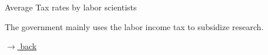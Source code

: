 \documentclass[11pt,aspectratio=169]{beamer}
\begin{document}
\begin{frame}{Average Tax rates by labor scientists}
\begin{figure}[h!!]
\begin{subfigure}{0.4\textwidth}
		\end{subfigure}
		
	\end{figure}
	\vspace{5mm}
	\begin{block}{}
		The government mainly uses the labor income tax to subsidize research.
	\end{block}	
	\vspace{-4mm}
	\hfill
	\hyperlink{backOPT}{\tiny{$\rightarrow$ back}}
	
\end{frame}



\end{document}
